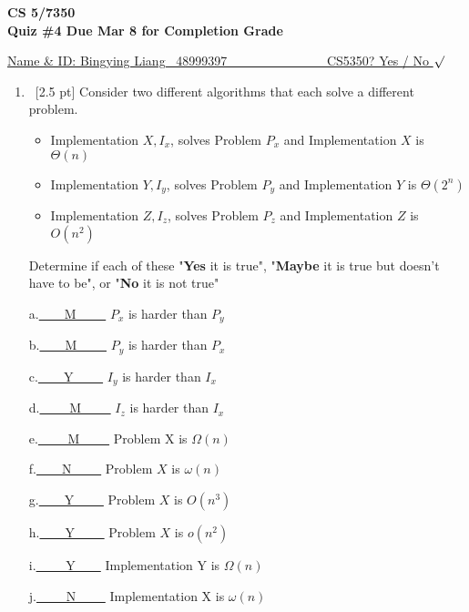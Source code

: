 \documentclass[12pt]{article}
\begin{document}
\renewcommand{\qedsymbol}{\filledbox}
\begin{center}
    \textbf{CS 5/7350} \\
    \textbf{Quiz \#4 Due Mar 8 for Completion Grade}
\end{center}
\begin{flushright}
\underline{Name \& ID: Bingying Liang \ 
48999397 \ \ \ \ \ \ \ \ \ \ \ \ \ \ \ CS5350? Yes / No $\surd$}
\end{flushright}

\begin{enumerate}
    \item \ [2.5 pt] Consider two different algorithms that each solve a different problem.
    \begin{itemize}
    \item Implementation $X, I_x$, solves Problem $P_x$ and Implementation $X$ is $\Theta(n)$
    \item Implementation $Y, I_y$, solves Problem $P_y$ and Implementation $Y$ is $\Theta(2^n)$
    \item Implementation $Z, I_z$, solves Problem $P_z$ and Implementation $Z$ is $O(n^2)$
    \end{itemize}
    Determine if each of these "\textbf{Yes} it is true", "\textbf{Maybe} it is true but doesn't have to be", or "\textbf{No} it is not true"
    \begin{multicols}{2}
    a.\underline{\ \ \ \ M \ \ \ \ } $P_x$ is harder than $P_y$ 
    
    b.\underline{\ \ \ \ M \ \ \ \ } $P_y$ is harder than $P_x$
    
    c.\underline{\ \ \ \ Y \ \ \ \ } $I_y$ is harder than $I_x$ %
    
    d.\underline{ \ \ \ \ M \ \ \ \ } $I_z$ is harder than $I_x$ %

    e.\underline{ \ \ \ \ M  \ \ \ \ } Problem X is $\Omega(n)$ %
    
    f.\underline{\ \ \ \ N \ \ \ \ } Problem $X$ is $\omega(n)$  %
    
    g.\underline{\ \ \ \ Y \ \ \ \ } Problem $X$ is $O(n^3)$ 
    
    h.\underline{\ \ \ \ Y \ \ \ \ } Problem $X$ is $o(n^2)$ %

    i.\underline{ \ \ \ \ Y\ \ \ \ } Implementation Y is $\Omega(n)$
    
    j.\underline{ \ \ \ \ N \ \ \ \ } Implementation X is $\omega(n)$


\end{multicols}
\end{enumerate}
\end{document}
